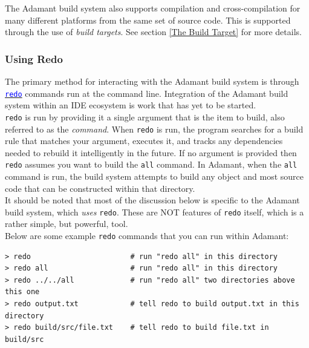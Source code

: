 The Adamant build system also supports compilation and cross-compilation for many different platforms from the same set of source code. This is supported through the use of \textit{build targets}. See section \ref{The Build Target} for more details.

\subsubsection{Using Redo} \label{Using Redo}

The primary method for interacting with the Adamant build system is through \href{https://redo.readthedocs.io/en/latest/}{\texttt{\textcolor{blue}{redo}}} commands run at the command line. Integration of the Adamant build system within an IDE ecosystem is work that has yet to be started. \\

\texttt{redo} is run by providing it a single argument that is the item to build, also referred to as the \textit{command}. When \texttt{redo} is run, the program searches for a build rule that matches your argument, executes it, and tracks any dependencies needed to rebuild it intelligently in the future.  If no argument is provided then \texttt{redo} assumes you want to build the \texttt{all} command. In Adamant, when the \texttt{all} command is run, the build system attempts to build any object and most source code that can be constructed within that directory. \\

It should be noted that most of the discussion below is specific to the Adamant build system, which \textit{uses} \texttt{redo}. These are NOT features of \texttt{redo} itself, which is a rather simple, but powerful, tool. \\

Below are some example \texttt{redo} commands that you can run within Adamant:

\vspace{5mm} %
\begin{verbatim}
> redo                       # run "redo all" in this directory
> redo all                   # run "redo all" in this directory
> redo ../../all             # run "redo all" two directories above this one
> redo output.txt            # tell redo to build output.txt in this directory
> redo build/src/file.txt    # tell redo to build file.txt in build/src
\end{verbatim}
\vspace{5mm} %


